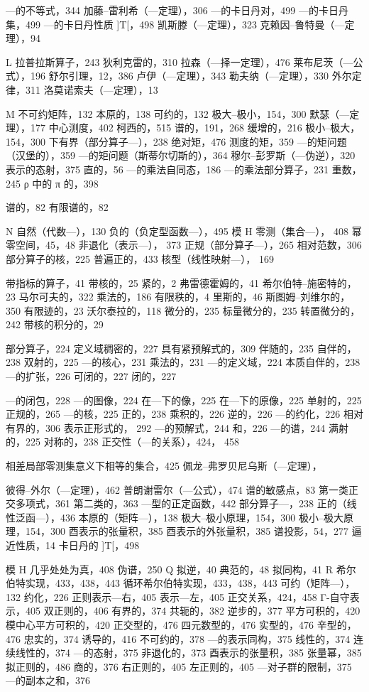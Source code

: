---的不等式，344 加藤--雷利希（---定理），306 ---的卡日丹对，499 ---的卡日丹集，499 ---的卡日丹性质 {]}T{[}，498 凯斯滕（---定理），323 克赖因--鲁特曼（---定理），94

L 拉普拉斯算子，243 狄利克雷的，310 拉森（---择一定理），476 莱布尼茨（---公式），196 舒尔引理，12，386 卢伊（---定理），343 勒夫纳（---定理），330 外尔定律，311 洛莫诺索夫（---定理），13

M 不可约矩阵，132 本原的，138 可约的，132 极大–极小，154，300 默瑟（---定理），177 中心测度，402 柯西的，515 谱的，191，268 缓增的，216 极小–极大，154，300 下有界（部分算子---），238 绝对矩，476 测度的矩，359 ---的矩问题（汉堡的），359 ---的矩问题（斯蒂尔切斯的），364 穆尔--彭罗斯（---伪逆），320 表示的态射，375 直的，56 ---的乘法自同态，186 ---的乘法部分算子，231 重数，245 ρ 中的 π 的，398

谱的，82 有限谱的，82

N 自然（代数---），130 负的（负定型函数---），495 模 H 零测（集合---），
408
幂零空间，45，48 非退化（表示---），
373
正规（部分算子---），265 相对范数，306 部分算子的核，225 普遍正的，433 核型（线性映射---），
169

带指标的算子，41 带核的，25 紧的，2 弗雷德霍姆的，41 希尔伯特--施密特的，23 马尔可夫的，322 乘法的，186 有限秩的，4 里斯的，46 斯图姆--刘维尔的，350 有限迹的，23 沃尔泰拉的，118 微分的，235 标量微分的，235 转置微分的，242 带核的积分的，29

部分算子，224 定义域稠密的，227 具有紧预解式的，309 伴随的，235 自伴的，238 双射的，225 ---的核心，231 乘法的，231 ---的定义域，224 本质自伴的，238 ---的扩张，226 可闭的，227 闭的，227

---的闭包，228 ---的图像，224 在---下的像，225 在---下的原像，225 单射的，225 正规的，265 ---的核，225 正的，238 乘积的，226 逆的，226 ---的约化，226 相对有界的，306 表示正形式的，
292
---的预解式，244 和，226 ---的谱，244 满射的，225 对称的，238 正交性（---的关系），424，
458

相差局部零测集意义下相等的集合，425 佩龙--弗罗贝尼乌斯（---定理），

彼得--外尔（---定理），462 普朗谢雷尔（---公式），474 谱的敏感点，83 第一类正交多项式，361 第二类的，363 ---型的正定函数，442 部分算子---，238 正的（线性泛函---），436 本原的（矩阵---），138 极大–极小原理，154，300 极小–极大原理，154，300 酉表示的张量积，385 酉表示的外张量积，385 谱投影，54，277 逼近性质，14 卡日丹的 {]}T{[}，498

模 H 几乎处处为真，408 伪谱，250 Q 拟逆，40 典范的，48 拟同构，41 R 希尔伯特实现，433，438，443 循环希尔伯特实现，433，438，443 可约（矩阵---），132 约化，226 正则表示---右，405 表示---左，405 正交关系，424，458 Γ-自守表示，405 双正则的，406 有界的，374 共轭的，382 逆步的，377 平方可积的，420 模中心平方可积的，420 正交型的，476 四元数型的，476 实型的，476 辛型的，476 忠实的，374 诱导的，416 不可约的，378 ---的表示同构，375 线性的，374 连续线性的，374 ---的态射，375 非退化的，373 酉表示的张量积，385 张量幂，385 拟正则的，486 商的，376 右正则的，405 左正则的，405 ---对子群的限制，375 ---的副本之和，376

